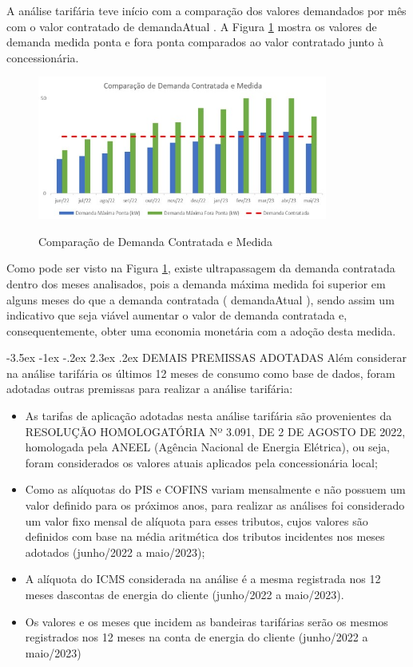 \documentclass[a4paper,12pt]{abntex2}
\makeatletter
\renewcommand\chapter{\@startsection{chapter}{0}{\z@}%
  {-3.5ex \@plus -1ex \@minus -.2ex}%
  {2.3ex \@plus.2ex}%
  {\normalfont\large\bfseries}}
\makeatother
\begin{document}
    A análise tarifária teve início com a comparação dos valores demandados por mês com o 
    valor contratado de {{ demandaAtual }}. A Figura \ref{fig:grafico2} mostra os valores de demanda medida ponta e fora 
    ponta comparados ao valor contratado junto à concessionária.

    \begin{figure}[!ht]
        \centering
        \caption{Comparação de Demanda Contratada e Medida}
        \includegraphics[width=0.85\textwidth]{templates/FIGS/grafico2}
        \label{fig:grafico2}
    \end{figure}

Como pode ser visto na Figura \ref{fig:grafico2}, existe ultrapassagem da demanda contratada dentro dos 
meses analisados, pois a demanda máxima medida foi superior em alguns meses  do que a demanda contratada
({{ demandaAtual }}), sendo assim um indicativo que seja viável aumentar  o valor de  demanda  contratada
e,  consequentemente,  obter  uma  economia  monetária  com  a adoção desta medida. 

\chapter{DEMAIS PREMISSAS ADOTADAS}
Além considerar na análise tarifária os últimos 12 meses de consumo como base de dados, 
foram adotadas outras premissas para realizar a análise tarifária:

\begin{itemize}
    \item As  tarifas  de  aplicação  adotadas  nesta  análise  tarifária  são  provenientes  da RESOLUÇÃO HOMOLOGATÓRIA  Nº 3.091, DE 2 DE AGOSTO DE 2022, homologada pela ANEEL (Agência Nacional de Energia Elétrica), ou seja, foram considerados os valores atuais aplicados pela concessionária local;
    \item Como as alíquotas do PIS e COFINS variam mensalmente e não possuem um valor definido  para os  próximos  anos, para  realizar as  análises  foi  considerado um  valor  fixo mensal de alíquota  para esses tributos, cujos valores são definidos com base na média aritmética dos tributos incidentes nos meses adotados (junho/2022 a maio/2023);
    \item A alíquota do ICMS considerada na análise é a mesma registrada nos 12 meses dascontas de energia do cliente (junho/2022 a maio/2023).
    \item Os  valores  e  os  meses  que  incidem  as  bandeiras  tarifárias  serão  os  mesmos registrados nos 12 meses na conta de energia do cliente (junho/2022 a maio/2023)
\end{itemize}
\end{document}
